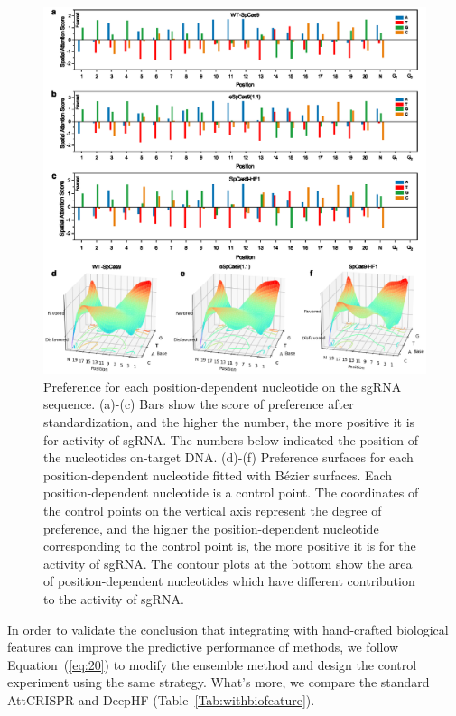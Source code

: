 \documentclass{bioinfo}
\begin{document}
\begin{figure}[!tpb]
    \centerline{\includegraphics[width=178mm]{spatialattention.eps}}
    \caption{Preference for each position-dependent nucleotide on the sgRNA sequence. 
(a)-(c) Bars show the score of preference after standardization, and the higher the number, the more positive it is for activity of sgRNA. 
The numbers below indicated the position of the nucleotides on-target DNA. 
(d)-(f) Preference surfaces for each position-dependent nucleotide fitted with Bézier surfaces. 
Each position-dependent nucleotide is a control point. 
The coordinates of the control points on the vertical axis represent the degree of preference, 
and the higher the position-dependent nucleotide corresponding to the control point is, the more positive it is for the activity of sgRNA.
The contour plots at the bottom show the area of position-dependent nucleotides which have different contribution to the activity of sgRNA. 
}\label{fig:spatialattention}
\end{figure}

In order to validate the conclusion that integrating with hand-crafted biological features can improve the predictive performance of methods, 
we follow Equation~(\ref{eq:20}) to modify the ensemble method and design the control experiment using the same strategy. 
What's more, we compare the standard AttCRISPR and DeepHF (Table~\ref{Tab:withbiofeature}).
\end{document}
